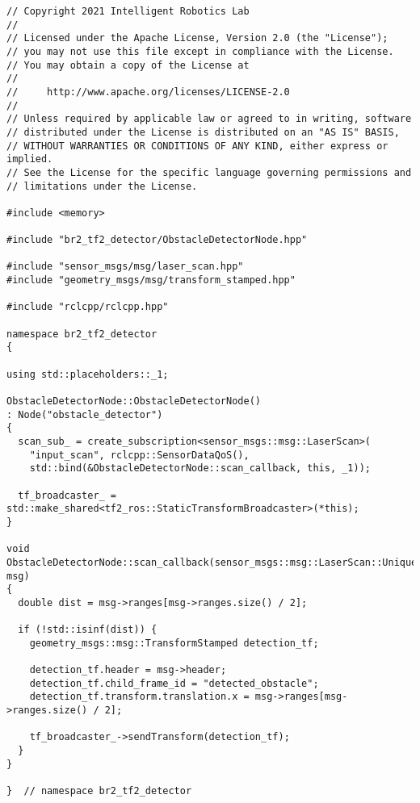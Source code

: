  \footnotesize
\begin{tcolorbox}[sharp corners, colframe=gray!80, colback=LightGray, left=0pt, top=0pt, bottom=0pt, title=\texttt{br2\_tf2\_detector/src/br2\_tf2\_detector/ObstacleDetectorNode.cpp}]
  \begin{verbatim}
// Copyright 2021 Intelligent Robotics Lab
//
// Licensed under the Apache License, Version 2.0 (the "License");
// you may not use this file except in compliance with the License.
// You may obtain a copy of the License at
//
//     http://www.apache.org/licenses/LICENSE-2.0
//
// Unless required by applicable law or agreed to in writing, software
// distributed under the License is distributed on an "AS IS" BASIS,
// WITHOUT WARRANTIES OR CONDITIONS OF ANY KIND, either express or implied.
// See the License for the specific language governing permissions and
// limitations under the License.

#include <memory>

#include "br2_tf2_detector/ObstacleDetectorNode.hpp"

#include "sensor_msgs/msg/laser_scan.hpp"
#include "geometry_msgs/msg/transform_stamped.hpp"

#include "rclcpp/rclcpp.hpp"

namespace br2_tf2_detector
{

using std::placeholders::_1;

ObstacleDetectorNode::ObstacleDetectorNode()
: Node("obstacle_detector")
{
  scan_sub_ = create_subscription<sensor_msgs::msg::LaserScan>(
    "input_scan", rclcpp::SensorDataQoS(),
    std::bind(&ObstacleDetectorNode::scan_callback, this, _1));

  tf_broadcaster_ = std::make_shared<tf2_ros::StaticTransformBroadcaster>(*this);
}

void
ObstacleDetectorNode::scan_callback(sensor_msgs::msg::LaserScan::UniquePtr msg)
{
  double dist = msg->ranges[msg->ranges.size() / 2];

  if (!std::isinf(dist)) {
    geometry_msgs::msg::TransformStamped detection_tf;

    detection_tf.header = msg->header;
    detection_tf.child_frame_id = "detected_obstacle";
    detection_tf.transform.translation.x = msg->ranges[msg->ranges.size() / 2];

    tf_broadcaster_->sendTransform(detection_tf);
  }
}

}  // namespace br2_tf2_detector
    \end{verbatim}
    \end{tcolorbox}
  \normalsize

